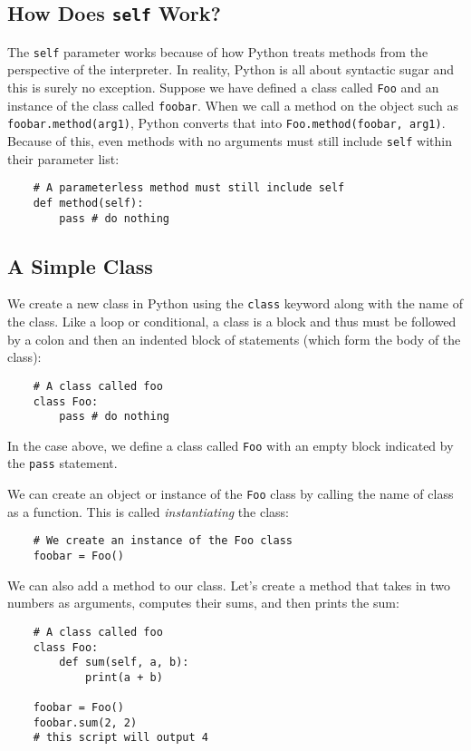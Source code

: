 \documentclass{cslesson}
\begin{document}
\subsection*{How Does \texttt{self} Work?}
The \texttt{self} parameter works because of how Python treats methods from the perspective of the interpreter. In reality, Python is all about syntactic sugar
and this is surely no exception. Suppose we have defined a class called \texttt{Foo} and an instance of the class called \texttt{foobar}. When we call a method
on the object such as \texttt{foobar.method(arg1)}, Python converts that into \texttt{Foo.method(foobar, arg1)}. Because of this, even methods with no
arguments must still include \texttt{self} within their parameter list:
\begin{verbatim}
    # A parameterless method must still include self
    def method(self):
        pass # do nothing
\end{verbatim}

\subsection{A Simple Class}
We create a new class in Python using the \texttt{class} keyword along with the name of the class. Like a loop or conditional, a class is a block and thus must be
followed by a colon and then an indented block of statements (which form the body of the class):

\begin{verbatim}
    # A class called foo
    class Foo:
        pass # do nothing
\end{verbatim}

In the case above, we define a class called \texttt{Foo} with an empty block indicated by the \texttt{pass} statement.

We can create an object or instance of the \texttt{Foo} class by calling the name of class as a function. This is called \textit{instantiating} the class:
\begin{verbatim}
    # We create an instance of the Foo class
    foobar = Foo()
\end{verbatim}

We can also add a method to our class. Let's create a method that takes in two numbers as arguments, computes their sums, and then prints the sum:

\begin{verbatim}
    # A class called foo
    class Foo:
        def sum(self, a, b):
            print(a + b)

    foobar = Foo()
    foobar.sum(2, 2)
    # this script will output 4
\end{verbatim}
\end{document}
